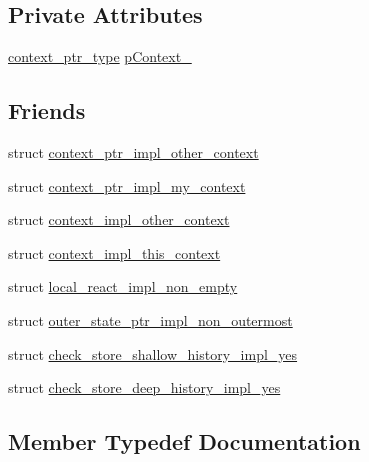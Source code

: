 \subsection*{Private Attributes}
\begin{DoxyCompactItemize}
\item 
\mbox{\hyperlink{classboost_1_1statechart_1_1simple__state_ac7e361322d53b3f57976ff23056b59e7}{context\+\_\+ptr\+\_\+type}} \mbox{\hyperlink{classboost_1_1statechart_1_1simple__state_ab0a0e8b8a6d851acec12c3f1a8515ca7}{p\+Context\+\_\+}}
\end{DoxyCompactItemize}
\subsection*{Friends}
\begin{DoxyCompactItemize}
\item 
struct \mbox{\hyperlink{classboost_1_1statechart_1_1simple__state_aec4b9ea7baa3f4fbfd4d31b299e27b6d}{context\+\_\+ptr\+\_\+impl\+\_\+other\+\_\+context}}
\item 
struct \mbox{\hyperlink{classboost_1_1statechart_1_1simple__state_a580f2b717109d522d6a39b7b2752b4a7}{context\+\_\+ptr\+\_\+impl\+\_\+my\+\_\+context}}
\item 
struct \mbox{\hyperlink{classboost_1_1statechart_1_1simple__state_a68d6ffdef25e37430a9e8ad34085a7a2}{context\+\_\+impl\+\_\+other\+\_\+context}}
\item 
struct \mbox{\hyperlink{classboost_1_1statechart_1_1simple__state_a0a3bf11a5ad2ed5b7695492424733c3e}{context\+\_\+impl\+\_\+this\+\_\+context}}
\item 
struct \mbox{\hyperlink{classboost_1_1statechart_1_1simple__state_a1fc1bf56babd5032f5f0a01e2431cca5}{local\+\_\+react\+\_\+impl\+\_\+non\+\_\+empty}}
\item 
struct \mbox{\hyperlink{classboost_1_1statechart_1_1simple__state_a8bf4a8a4136a41ed8b67c3a4c809d4c9}{outer\+\_\+state\+\_\+ptr\+\_\+impl\+\_\+non\+\_\+outermost}}
\item 
struct \mbox{\hyperlink{classboost_1_1statechart_1_1simple__state_a871eee27caa9713c636df492328cfd1a}{check\+\_\+store\+\_\+shallow\+\_\+history\+\_\+impl\+\_\+yes}}
\item 
struct \mbox{\hyperlink{classboost_1_1statechart_1_1simple__state_af4fe78048d6db7f6a1699d9eb26f1ef7}{check\+\_\+store\+\_\+deep\+\_\+history\+\_\+impl\+\_\+yes}}
\end{DoxyCompactItemize}


\subsection{Member Typedef Documentation}
\mbox{\label{classboost_1_1statechart_1_1simple__state_a0a4e135c0eb6d114bd2e3e6e61ea3d5f}} 
